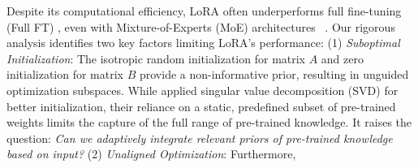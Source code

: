 Despite its computational efficiency, LoRA often underperforms full fine-tuning (Full FT) \cite{wang2024loraprolowrankadaptersproperly,wanglora,fan2024on}, even with Mixture-of-Experts (MoE) architectures ~\cite{zadouri2024pushing,liu2024adamole,tian2024hydraloraasymmetricloraarchitecture}. 
Our rigorous analysis identifies two key factors limiting LoRA’s performance:
(1) \textit{Suboptimal Initialization}: The isotropic random initialization for matrix \( A \) and zero initialization for matrix \(B\) provide a non-informative prior, resulting in unguided optimization subspaces.
While \citet{wang2024miloraharnessingminorsingular,meng2024pissa} applied singular value decomposition (SVD) for better initialization, their reliance on a static, predefined subset of pre-trained weights limits the capture of the full range of pre-trained knowledge.
It raises the question: \textit{Can we adaptively integrate relevant priors of pre-trained knowledge based on input?} 
(2) \textit{Unaligned Optimization}: Furthermore, 
